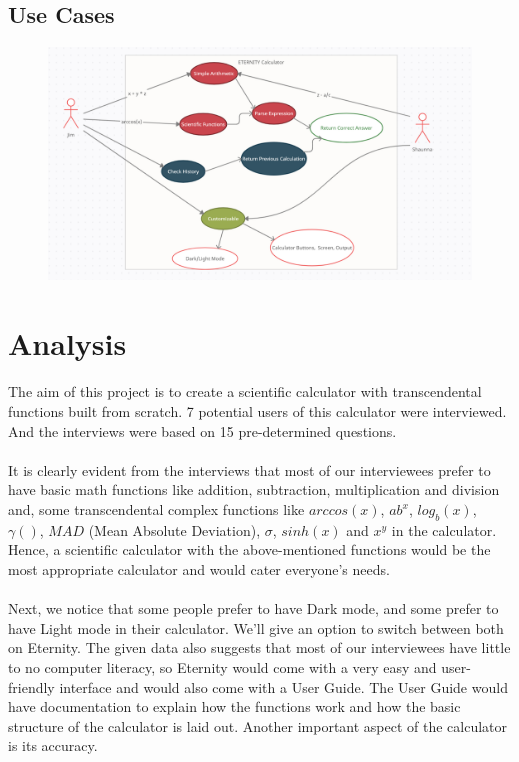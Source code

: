 \documentclass[titlepage]{article}
\begin{document}
        \subsection{Use Cases} 
            \begin{figure}[!htb]
                \centering
                \includegraphics[scale=0.65]{images/UseCases.PNG}
            \end{figure}
            \FloatBarrier
            
\section{Analysis}
        \paragraph{}
        The aim of this project is to create a scientific calculator with transcendental functions built from scratch. 7 potential users of this calculator were interviewed. And the interviews were based on 15 pre-determined questions.

       \paragraph{}
        It is clearly evident from the interviews that most of our interviewees prefer to have basic math functions like addition, subtraction, multiplication and division and, some transcendental complex functions like $arccos(x)$, $ab^x$, $log_b(x)$, $\gamma ()$, $MAD$ (Mean Absolute Deviation), $\sigma$, $sinh(x)$ and $x^y$ in the calculator. Hence, a scientific calculator with the above-mentioned functions would be the most appropriate calculator and would cater everyone’s needs. 
        
        \paragraph{}
        Next, we notice that some people prefer to have Dark mode, and some prefer to have Light mode in their calculator. We’ll give an option to switch between both on Eternity. The given data also suggests that most of our interviewees have little to no computer literacy, so Eternity would come with a very easy and user-friendly interface and would also come with a User Guide. The User Guide would have documentation to explain how the functions work and how the basic structure of the calculator is laid out. Another important aspect of the calculator is its accuracy.
        
\end{document}
